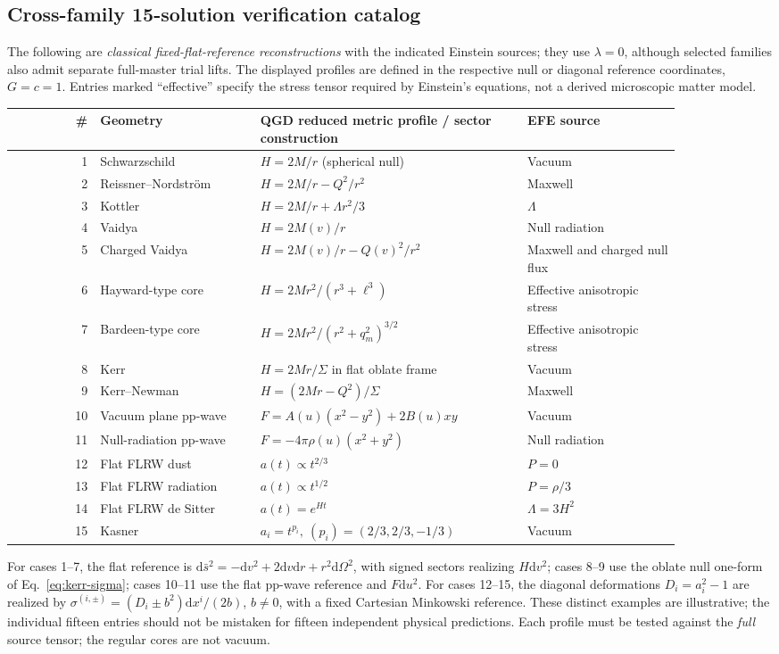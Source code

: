 \documentclass[11pt,a4paper]{article}
\newcommand{\dd}{\mathrm d}
\begin{document}
\subsection{Cross-family 15-solution verification catalog}\label{sec:catalog15}
The following are \emph{classical fixed-flat-reference reconstructions} with the indicated Einstein sources; they use \(\lambda=0\), although selected families also admit separate full-master trial lifts. The displayed profiles are defined in the respective null or diagonal reference coordinates, \(G=c=1\). Entries marked ``effective'' specify the stress tensor required by Einstein's equations, not a derived microscopic matter model.
\begin{longtable}{@{}r p{0.24\linewidth} p{0.40\linewidth} p{0.23\linewidth}@{}}\toprule
\# & Geometry & QGD reduced metric profile / sector construction & EFE source\\\midrule\endhead
1 & Schwarzschild & \(H=2M/r\) (spherical null) & Vacuum\\
2 & Reissner--Nordstr\"om & \(H=2M/r-Q^2/r^2\) & Maxwell\\
3 & Kottler & \(H=2M/r+\Lambda r^2/3\) & \(\Lambda\)\\
4 & Vaidya & \(H=2M(v)/r\) & Null radiation\\
5 & Charged Vaidya & \(H=2M(v)/r-Q(v)^2/r^2\) & Maxwell and charged null flux\\
6 & Hayward-type core & \(H=2Mr^2/(r^3+\ell^3)\) & Effective anisotropic stress\\
7 & Bardeen-type core & \(H=2Mr^2/(r^2+q_m^2)^{3/2}\) & Effective anisotropic stress\\
8 & Kerr & \(H=2Mr/\Sigma\) in flat oblate frame & Vacuum\\
9 & Kerr--Newman & \(H=(2Mr-Q^2)/\Sigma\) & Maxwell\\
10 & Vacuum plane pp-wave & \(F=A(u)(x^2-y^2)+2B(u)xy\) & Vacuum\\
11 & Null-radiation pp-wave & \(F=-4\pi\rho(u)(x^2+y^2)\) & Null radiation\\
12 & Flat FLRW dust & \(a(t)\propto t^{2/3}\) & \(P=0\)\\
13 & Flat FLRW radiation & \(a(t)\propto t^{1/2}\) & \(P=\rho/3\)\\
14 & Flat FLRW de Sitter & \(a(t)=e^{Ht}\) & \(\Lambda=3H^2\)\\
15 & Kasner & \(a_i=t^{p_i},\ (p_i)=(2/3,2/3,-1/3)\) & Vacuum\\\bottomrule
\end{longtable}
For cases 1--7, the flat reference is \(\dd\bar s^2=-\dd v^2+2\dd v\dd r+r^2\dd\Omega^2\), with signed sectors realizing \(H\dd v^2\); cases 8--9 use the oblate null one-form of Eq.~\eqref{eq:kerr-sigma}; cases 10--11 use the flat pp-wave reference and \(F\dd u^2\). For cases 12--15, the diagonal deformations \(D_i=a_i^2-1\) are realized by \(\sigma^{(i,\pm)}=(D_i\pm b^2)\dd x^i/(2b)\), \(b\ne0\), with a fixed Cartesian Minkowski reference. These distinct examples are illustrative; the individual fifteen entries should not be mistaken for fifteen independent physical predictions. Each profile must be tested against the \emph{full} source tensor; the regular cores are not vacuum.
\end{document}
